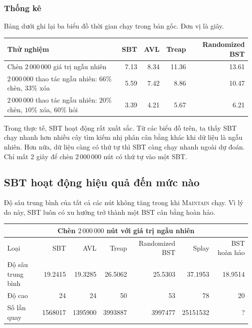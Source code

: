 \documentclass[11pt]{article}
\begin{document}
\subsubsection{Thống kê}

Bảng dưới ghi lại ba biểu đồ thời gian chạy trong bản gốc. Đơn vị là giây.

\begin{center}
\small
\setlength{\tabcolsep}{4pt}
\begin{tabular}{l|rrrr}
\hline
Thử nghiệm & SBT & AVL & Treap & Randomized BST\\
\hline
Chèn $2\,000\,000$ giá trị ngẫu nhiên & 7.13 & 8.34 & 11.36 & 13.61\\
$2\,000\,000$ thao tác ngẫu nhiên: $66\%$ chèn, $33\%$ xóa
  & 5.59 & 7.42 & 8.86 & 10.47\\
$2\,000\,000$ thao tác ngẫu nhiên: $20\%$ chèn, $10\%$ xóa, $60\%$ hỏi
  & 3.39 & 4.21 & 5.67 & 6.21\\
\hline
\end{tabular}
\end{center}

Trong thực tế, SBT hoạt động rất xuất sắc. Từ các biểu đồ trên, ta thấy SBT
chạy nhanh hơn nhiều cây tìm kiếm nhị phân cân bằng khác khi dữ liệu là ngẫu
nhiên. Hơn nữa, dữ liệu càng có thứ tự thì SBT càng chạy nhanh ngoài dự đoán.
Chỉ mất $2$ giây để chèn $2\,000\,000$ nút có thứ tự vào một SBT.

\subsection{SBT hoạt động hiệu quả đến mức nào}

Độ sâu trung bình của tất cả các nút không tăng trong khi \textsc{Maintain}
chạy. Vì lý do này, SBT luôn có xu hướng trở thành một BST cân bằng hoàn hảo.

\begin{center}
\small
\setlength{\tabcolsep}{3.5pt}
\begin{tabular}{l|rrrrrr}
\multicolumn{7}{c}{Chèn $2\,000\,000$ nút với giá trị ngẫu nhiên}\\
\hline
Loại & SBT & AVL & Treap & Randomized BST & Splay & BST hoàn hảo\\
\hline
Độ sâu trung bình & 19.2415 & 19.3285 & 26.5062 & 25.5303 & 37.1953 & 18.9514\\
Độ cao & 24 & 24 & 50 & 53 & 78 & 20\\
Số lần quay & 1568017 & 1395900 & 3993887 & 3997477 & 25151532 & ?\\
\end{tabular}
\end{center}
\end{document}
